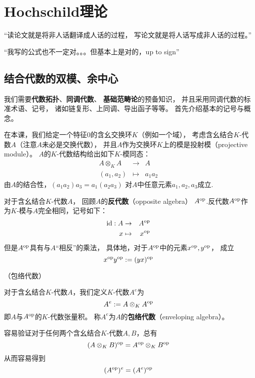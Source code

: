\chapter{Hochschild理论}
\begin{center}
“读论文就是将非人话翻译成人话的过程，
写论文就是将人话写成非人话的过程。”

“我写的公式也不一定对。。。但基本上是对的，up to sign”
\end{center}

\section{结合代数的双模、余中心}

我们需要\textbf{代数拓扑}、\textbf{同调代数}、
\textbf{基础范畴论}的预备知识，
并且采用同调代数的标准术语、记号，
诸如链复形、上同调、导出函子等等。
首先介绍基本的记号与概念。

在本课，我们给定一个特征$0$的含幺交换环$K$（例如一个域），
考虑含幺结合$K$-代数$A$（注意$A$未必是交换代数），
并且$A$作为交换环$K$上的模是投射模（projective module）。
$A$的$K$-代数结构给出如下$K$-模同态：
\begin{eqnarray*}
A\otimes_KA        &\rightarrow& A\\
(a_1,a_2)          &\mapsto    & a_1a_2
\end{eqnarray*}
由$A$的结合性，$(a_1a_2)a_3=a_1(a_2a_3)$
对$A$中任意元素$a_1,a_2,a_3$成立.

对于含幺结合$K$-代数$A$，
回顾$A$的\textbf{反代数}（opposite algebra）
$A^{\text{op}}$.反代数$A^{\text{op}}$作为$K$-模与$A$完全相同，记号如下：
\begin{eqnarray*}
\text{id}:A &\rightarrow & A^{\text{op}}\\
x&\mapsto&x^{\text{op}}
\end{eqnarray*}
但是$A^{\text{op}}$具有与$A$“相反”的乘法，
具体地，对于$A^{\text{op}}$中的元素$x^{\text{op}},y^{\text{op}}$，
成立
$$x^{\text{op}} y^{\text{op}}:=(yx)^{\text{op}}$$

\begin{definition}（包络代数）

对于含幺结合$K$-代数$A$，我们定义$K$-代数$A^e$为
$$A^e:=A\otimes_K A^{\text{op}}$$
即$A$与$A^{\text{op}}$的$K$-代数张量积。
称$A^e$为$A$的\textbf{包络代数}（enveloping algebra）。
\end{definition}

容易验证对于任何两个含幺结合$K$-代数$A,B$，总有
$$(A\otimes_K B)^{\text{op}}=A^{\text{op}}\otimes_{K}B^{\text{op}}$$
从而容易得到
$$(A^{\text{op}})^e=(A^e)^{\text{op}}$$

